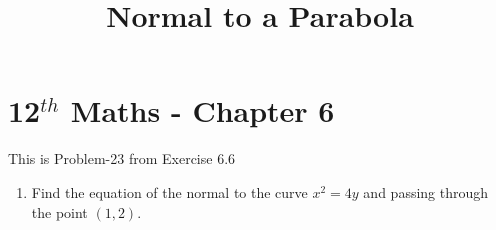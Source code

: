 \documentclass[12pt]{article}
\begin{document}
\begin{center}
	\title{\textbf{Normal to a Parabola}}
\date{\vspace{-5ex}} %
\maketitle
\end{center}
\setcounter{page}{1}

\section{12$^{th}$ Maths - Chapter 6}
This is Problem-23 from Exercise 6.6 
\begin{enumerate}
	\item Find the equation of the normal to the curve $x^2=4y$ and passing through the point $(1,2)$.


\end{enumerate}
\end{document}
